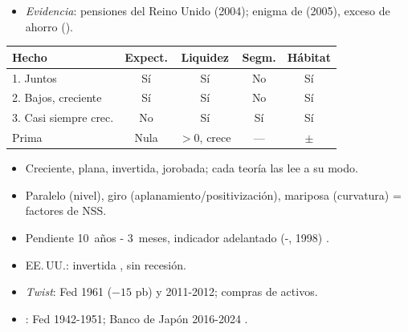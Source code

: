 \documentclass{article}
\begin{document}
\begin{columnas}
\begin{itemize}
\item \emph{Evidencia}: pensiones del Reino Unido (2004); enigma de  (2005), exceso de ahorro ().
\end{itemize}
\begin{center}\small
\begin{tabular}{lcccc}
\toprule
\rowcolor{tceeazulpalido}\textbf{Hecho} & \textbf{Expect.} & \textbf{Liquidez} & \textbf{Segm.} & \textbf{Hábitat}\\
\midrule
1. Juntos & Sí & Sí & No & Sí\\
2. Bajos, creciente & Sí & Sí & No & Sí\\
3. Casi siempre crec. & No & Sí & Sí & Sí\\
\rowcolor{tceesalvia}Prima & Nula & $>0$, crece & --- & $\pm$\\
\bottomrule
\end{tabular}
\end{center}

\begin{itemize}
\item Creciente, plana, invertida, jorobada; cada teoría las lee a su modo.
\end{itemize}
\begin{itemize}
\item Paralelo (nivel), giro (aplanamiento/positivización), mariposa (curvatura) = factores de NSS.
\end{itemize}
\begin{itemize}
\item Pendiente 10~años - 3~meses, indicador adelantado (-, 1998) .
\item EE.\,UU.: invertida , sin recesión.
\end{itemize}
\begin{itemize}
\item \emph{Twist}: Fed 1961 ($-15$ pb) y 2011-2012; compras de activos.
\item {}: Fed 1942-1951; Banco de Japón 2016-2024 .
\end{itemize}


\end{columnas}
\end{document}
